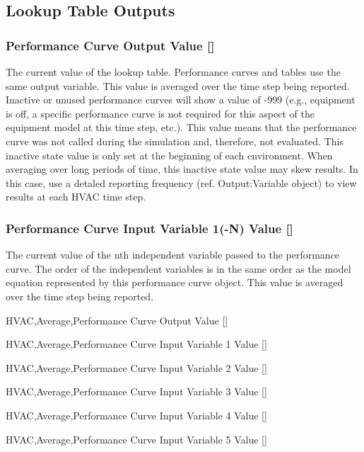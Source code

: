 \subsection{Lookup Table Outputs}\label{lookup-table-outputs}

\subsubsection{\texorpdfstring{Performance Curve Output Value {[]}}{Performance Curve Output Value }}\label{performance-curve-output-value-2}

The current value of the lookup table. Performance curves and tables use the same output variable. This value is averaged over the time step being reported. Inactive or unused performance curves will show a value of -999 (e.g., equipment is off, a specific performance curve is not required for this aspect of the equipment model at this time step, etc.). This value means that the performance curve was not called during the simulation and, therefore, not evaluated. This inactive state value is only set at the beginning of each environment. When averaging over long periods of time, this inactive state value may skew results. In this case, use a detaled reporting frequency (ref. Output:Variable object) to view results at each HVAC time step.

\subsubsection{\texorpdfstring{Performance Curve Input Variable 1(-N) Value {[]}}{Performance Curve Input Variable 1(-N) Value }}\label{performance-curve-input-variable-1-n-value-000}

The current value of the nth independent variable passed to the performance curve. The order of the independent variables is in the same order as the model equation represented by this performance curve object. This value is averaged over the time step being reported.

HVAC,Average,Performance Curve Output Value {[]}

HVAC,Average,Performance Curve Input Variable 1 Value {[]}

HVAC,Average,Performance Curve Input Variable 2 Value {[]}

HVAC,Average,Performance Curve Input Variable 3 Value {[]}

HVAC,Average,Performance Curve Input Variable 4 Value {[]}

HVAC,Average,Performance Curve Input Variable 5 Value {[]}
